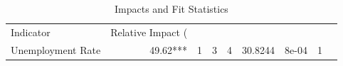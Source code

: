 \begin{table}[!h]
\centering
\caption{Impacts and Fit Statistics}
\centering
\begin{tabular}[t]{lrrrrrrr}
\toprule
Indicator & Relative Impact (%
\midrule
{} &  &  &  &  &  &  & \\
Unemployment Rate & 49.62*** & 1 & 3 & 4 & 30.8244 & 8e-04 & 1\\
\bottomrule
\end{tabular}
\end{table}
